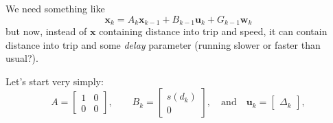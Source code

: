 \documentclass[11pt]{article}\usepackage[]{graphicx}\usepackage[]{color}
\newcommand{\bx}{\boldsymbol{x}}
\newcommand{\bu}{\boldsymbol{u}}
\newcommand{\bw}{\boldsymbol{w}}
\begin{document}
We need something like
\begin{equation}
  \label{eq:speed_model_required}
  \bx_k = A_k \bx_{k-1} + B_{k-1} \bu_k + G_{k-1} \bw_k
\end{equation}
but now, instead of $\bx$ containing distance into trip and speed, it can contain distance into trip
and some \emph{delay} parameter (running slower or faster than usual?).

Let's start very simply:
\begin{equation*}
  A =
  \begin{bmatrix}
    1 & 0 \\
    0 & 0
  \end{bmatrix},\qquad
  B_k =
  \begin{bmatrix}
    s(d_k) \\ 0
  \end{bmatrix},\quad\text{and}\quad
  \bu_k =
  \begin{bmatrix}
    \Delta_k
  \end{bmatrix},
\end{equation*}
\end{document}
